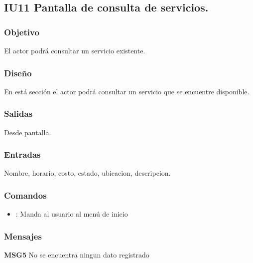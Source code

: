 \subsection{IU11 Pantalla de consulta de servicios.}

\subsubsection{Objetivo}
	El actor podrá consultar un servicio existente.

\subsubsection{Diseño}
	En está sección el actor podrá consultar un servicio que se encuentre disponible.


\subsubsection{Salidas}

	Desde pantalla.

\subsubsection{Entradas}
Nombre, horario, costo, estado, ubicacion, descripcion.

\subsubsection{Comandos}
\begin{itemize}
	\item {}: Manda al usuario al menú de inicio
\end{itemize}

\subsubsection{Mensajes}
	\begin{Citemize}
		\item {\bf MSG5} No se encuentra ningun dato registrado
	\end{Citemize}


